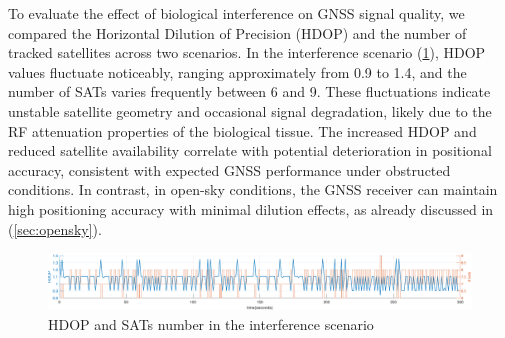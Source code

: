To evaluate the effect of biological interference on GNSS signal quality, we compared the Horizontal Dilution of Precision (HDOP) and the number of tracked satellites across two scenarios. In the interference scenario (\ref{fig:carne_hdop}), HDOP values fluctuate noticeably, ranging approximately from 0.9 to 1.4, and the number of SATs varies frequently between 6 and 9. These fluctuations indicate unstable satellite geometry and occasional signal degradation, likely due to the RF attenuation properties of the biological tissue. The increased HDOP and reduced satellite availability correlate with potential deterioration in positional accuracy, consistent with expected GNSS performance under obstructed conditions.
In contrast, in open-sky conditions, the GNSS receiver can maintain high positioning accuracy with minimal dilution effects, as already discussed in (\ref{sec:opensky}).


\begin{figure}[H]
    \centering
    \includegraphics[width=1.00
    \linewidth]{images/carne_hdop_carne.pdf}
    \caption{HDOP and SATs number in the interference scenario}
    \label{fig:carne_hdop}
\end{figure}

